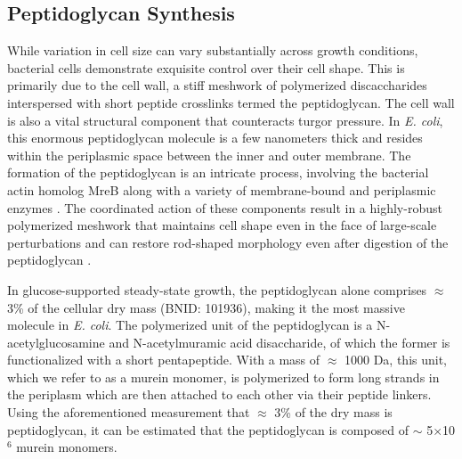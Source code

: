 \subsection{Peptidoglycan Synthesis}
While variation in cell size can vary substantially across growth conditions,
bacterial cells demonstrate exquisite control over their cell shape. This is
primarily due to the cell wall, a stiff meshwork of polymerized discaccharides
interspersed with short peptide crosslinks termed the peptidoglycan. The cell
wall is also a vital structural component that counteracts turgor pressure. In
\textit{E. coli}, this enormous peptidoglycan molecule is a few nanometers thick
and resides within the periplasmic space between the inner and outer membrane.
The formation of the peptidoglycan is an intricate process, involving the
bacterial actin homolog MreB \citep{shi2018} along with a variety of
membrane-bound and periplasmic enzymes \citep{morgenstein2015}. The coordinated
action of these components result in a highly-robust polymerized meshwork that
maintains cell shape even in the face of large-scale perturbations and can
restore rod-shaped morphology even after digestion of the peptidoglycan
\citep{harris2018,shi2018}.

In glucose-supported steady-state growth, the peptidoglycan alone comprises
$\approx$ 3\% of the cellular dry mass (BNID: 101936), making
it the most massive molecule in \textit{E. coli}. The polymerized unit of the
peptidoglycan is a N-acetylglucosamine and N-acetylmuramic acid disaccharide,
of which the former  is functionalized with a short pentapeptide. With a mass of
$\approx$ 1000 Da, this unit, which we refer to as a murein monomer, is
polymerized to form long strands in the periplasm which are then attached to
each other via their peptide linkers. Using the aforementioned measurement that
$\approx$ 3\% of the dry mass is peptidoglycan, it can be estimated that the
peptidoglycan is composed of $\sim$ 5$\times$10$^6$ murein monomers.


